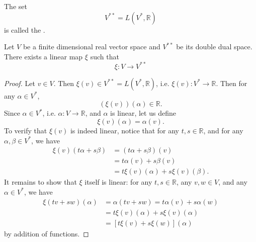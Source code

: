 \documentclass[notoc,notitlepage]{tufte-book}
\begin{document}
\begin{defn}\label{defn:double_dual_space}
  The set
  \begin{equation*}
    V^{**} = L(V^*, \mathbb{R})
  \end{equation*}
  is called the .
\end{defn}

\begin{propo}\label{propo:the_space_and_its_double_dual_space}
  Let $V$ be a finite dimensional real vector space and $V^{**}$ be its double dual space. There exists a linear map $\xi$ such that
  \begin{equation*}
    \xi : V \to V^{**}
  \end{equation*}
\end{propo}

\begin{proof}

  Let $v \in V$. Then $\xi(v) \in V^{**} = L(V^*, \mathbb{R})$,
  i.e. $\xi(v) : V^* \to \mathbb{R}$. Then for any $\alpha \in V^*$,
  \begin{equation*}
    \left( \xi(v) \right)(\alpha) \in \mathbb{R}.
  \end{equation*}
  Since $\alpha \in V^*$, i.e. $\alpha : V \to \mathbb{R}$,
  and $\alpha$ is linear, let us define
  \begin{equation*}
    \xi(v)(\alpha) = \alpha(v).
  \end{equation*}
  To verify that $\xi(v)$ is indeed linear, notice that
  for any $t, s \in \mathbb{R}$, and for any $\alpha, \beta \in V^*$,
  we have
  \begin{align*}
    \xi(v)(t \alpha + s \beta)
      &= (t \alpha + s \beta) (v) \\
      &= t \alpha(v) + s \beta(v) \\
      &= t \xi(v)(\alpha) + s \xi(v)(\beta).
  \end{align*}
  It remains to show that $\xi$ itself is linear:
  for any $t, s \in \mathbb{R}$, any $v, w \in V$,
  and any $\alpha \in V^*$, we have
  \begin{align*}
    \xi(tv + sw)(\alpha)
      &= \alpha (tv + sw) = t \alpha(v) + s \alpha(w) \\
      &= t \xi(v)(\alpha) + s \xi(v)(\alpha) \\
      &= [ t \xi(v) + s \xi(w) ](\alpha)
  \end{align*}
  by addition of functions.
\end{proof}
\end{document}

